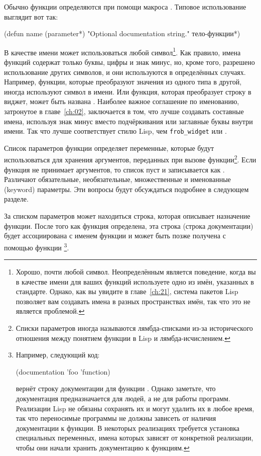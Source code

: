 Обычно функции определяются при помощи макроса .  Типовое использование
 выглядит вот так:

\begin{myverb}
  (defun name (parameter*)
    "Optional documentation string."
    тело-функции*)
\end{myverb}

В качестве имени может использоваться любой символ\footnote{Хорошо, почти любой символ.
  Неопределённым является поведение, когда вы в качестве имени для ваших функций
  используете одно из имён, указанных в стандарте.  Однако, как вы увидите в главе~\ref{ch:21},
  система пакетов Lisp позволяет вам создавать имена в разных пространствах имён, так что
  это не является проблемой.}.  Как правило, имена функций содержат только буквы, цифры и
знак минус, но, кроме того, разрешено использование других символов, и они используются в
определённых случаях.  Например, функции, которые преобразуют значения из одного типа в
другой, иногда используют символ \code{->} в имени. Или функция, которая преобразует
строку в виджет, может быть названа .  Наиболее важное соглашение по
именованию, затронутое в главе~\ref{ch:02}, заключается в том, что лучше создавать составные имена,
используя знак минус вместо подчёркивания или заглавные буквы внутри имени.
Так что  лучше соответствует стилю Lisp, чем \lstinline!frob_widget! или
.

Список параметров функции определяет переменные, которые будут использоваться для хранения
аргументов, переданных при вызове функции\footnote{Списки параметров иногда называются
  лямбда-списками из-за исторического отношения между понятием функции в Lisp и
  лямбда-исчислением.}.  Если функция не принимает аргументов, то список пуст и
записывается как \code{()}. Различают обязательные, необязательные, множественные и
именованные (keyword) параметры.  Эти вопросы будут обсуждаться подробнее в следующем
разделе.

За списком параметров может находиться строка, которая описывает назначение функции.
После того как функция определена, эта строка (строка документации) будет ассоциирована
с именем функции и может быть позже получена с помощью функции
\footnote{Например, следующий код:

\begin{myverb}
  (documentation 'foo 'function)
\end{myverb}

\noindent{}вернёт строку документации для функции .  Однако заметьте, что документация
предназначается для людей, а не для работы программ.  Реализации Lisp не обязаны сохранять
их и могут удалить их в любое время, так что переносимые программы не должны
зависеть от наличия документации к функции.  В некоторых реализациях требуется установка
специальных переменных, имена которых зависят от конкретной реализации, чтобы они начали
хранить документацию к функциям.}.

